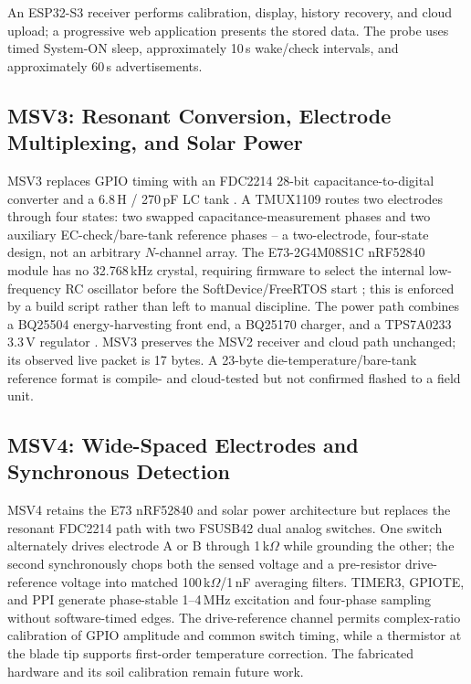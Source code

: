 \documentclass[conference]{IEEEtran}
\begin{document}
An ESP32-S3 receiver performs calibration, display, history recovery, and cloud upload; a
progressive web application presents the stored data. The probe uses timed System-ON sleep,
approximately 10\,s wake/check intervals, and approximately 60\,s advertisements.

\subsection{MSV3: Resonant Conversion, Electrode Multiplexing, and Solar Power}
MSV3 replaces GPIO timing with an FDC2214 28-bit capacitance-to-digital converter and a
6.8\,\textmu H / 270\,pF LC tank \cite{ti_fdc2214}. A TMUX1109 routes two electrodes through four
states: two swapped capacitance-measurement phases and two auxiliary EC-check/bare-tank reference
phases \cite{ti_tmux1109} -- a two-electrode, four-state design, not an arbitrary $N$-channel
array. The E73-2G4M08S1C nRF52840 module has no 32.768\,kHz crystal, requiring firmware to select
the internal low-frequency RC oscillator before the SoftDevice/FreeRTOS start
\cite{nordic_nrf52840, project_lfclk_hang}; this is enforced by a build script rather than left to
manual discipline. The power path combines a BQ25504 energy-harvesting front end, a BQ25170
charger, and a TPS7A0233 3.3\,V regulator \cite{ti_bq25504}. MSV3 preserves the MSV2 receiver and
cloud path unchanged; its observed live packet is 17 bytes. A 23-byte die-temperature/bare-tank
reference format is compile- and cloud-tested but not confirmed flashed to a field unit.

\subsection{MSV4: Wide-Spaced Electrodes and Synchronous Detection}
MSV4 retains the E73 nRF52840 and solar power architecture but replaces the resonant FDC2214 path
with two FSUSB42 dual analog switches. One switch alternately drives electrode A or B through
1\,k$\Omega$ while grounding the other; the second synchronously chops both the sensed voltage and
a pre-resistor drive-reference voltage into matched 100\,k$\Omega$/1\,nF averaging filters. TIMER3,
GPIOTE, and PPI generate phase-stable 1--4\,MHz excitation and four-phase sampling without
software-timed edges. The drive-reference channel permits complex-ratio calibration of GPIO
amplitude and common switch timing, while a thermistor at the blade tip supports first-order
temperature correction. The fabricated hardware and its soil calibration remain future work.
\end{document}
